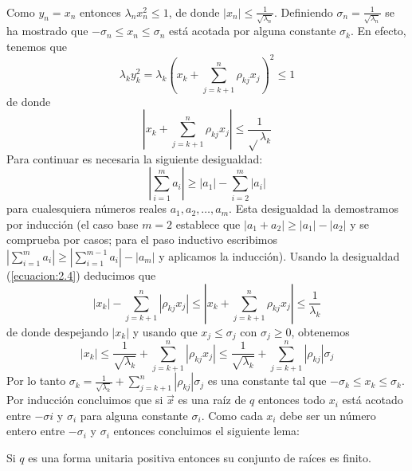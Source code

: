 \paragraph{}
Como $y_{n} = x_{n}$ entonces $\lambda_{n}x_{n}^{2} \leq 1$, de donde $|x_{n}| \leq \frac{1}{\sqrt{\lambda_{n}}}$. Definiendo $\sigma_{n}=\frac{1}{\sqrt{\lambda_{n}}}$ se ha mostrado que $-\sigma_{n} \leq x_{n} \leq \sigma_{n}$ está acotada por alguna constante $\sigma_{k}$. En efecto, tenemos que 
\begin{equation*}
\lambda_{k}y_{k}^{2} = \lambda_{k}\left(x_{k} + \sum_{j=k+1}^{n}\rho_{kj}x_{j}\right)^{2} \leq 1
\end{equation*} 
de donde 
\begin{equation*}
\left|x_{k} + \sum_{j=k+1}^{n} \rho_{kj} x_{j}\right| \leq \frac{1}{\sqrt{}\lambda_{k}}
\end{equation*} 
Para continuar es necesaria la siguiente desigualdad:
\begin{equation}
\left|\sum_{i=1}^{m} a_{i}\right| \geq \left|a_{1}\right| - \sum_{i=2}^{m}\left|a_{i}\right|
\label{ecuacion:2.4}
\end{equation} 
para cualesquiera números reales $a_{1}, a_{2}, \ldots, a_{m}$. Esta desigualdad la demostramos por inducción (el caso base $m=2$ establece que $\left|a_{1} + a_{2}\right| \geq \left|a_{1}\right| - \left|a_{2}\right|$ y se comprueba por casos; para el paso inductivo escribimos $\left|\sum_{i=1}^{m}a_{i}\right| \geq \left|\sum_{i=1}^{m-1}a_{i}\right| - \left|a_{m}\right|$ y aplicamos la inducción). Usando la desigualdad (\ref{ecuacion:2.4}) deducimos que 
\begin{equation*}
\left|x_{k}\right| - \sum_{j=k+1}^{n}\left| \rho_{kj}x_{j}\right| \leq \left|x_{k} + \sum_{j=k+1}^{n}\rho_{kj}x_{j}\right| \leq \frac{1}{\lambda_{k}}
\end{equation*} 
de donde despejando $\left|x_{k}\right|$ y usando que $x_{j} \leq \sigma_{j}$ con $\sigma_{j} \geq 0$, obtenemos
\begin{equation*}
\left|x_{k}\right| \leq \frac{1}{\sqrt{\lambda_{k}}} + \sum_{j=k+1}^{n}\left| \rho_{kj}x_{j}\right| \leq \frac{1}{\sqrt{\lambda_{k}}} + \sum_{j=k+1}^{n}\left|\rho_{kj}\right|\sigma_{j}
\end{equation*}
Por lo tanto $\sigma_{k} = \frac{1}{\sqrt{\lambda_{k}}} + \sum_{j=k+1}^{n}\left|\rho_{kj}\right|\sigma_{j}$ es una constante tal que $-\sigma_{k} \leq x_{k} \leq \sigma_{k}$. Por inducción concluimos que si $\overrightarrow{x}$ es una raíz de $q$ entonces todo $x_{i}$ está acotado entre $-\sigma{i}$ y $\sigma_{i}$ para alguna constante $\sigma_{i}$. Como cada $x_{i}$ debe ser un número entero entre $-\sigma_{i}$ y $\sigma_{i}$ entonces concluimos el siguiente lema:
\begin{lemma}
Si $q$ es una forma unitaria positiva entonces su conjunto de raíces es finito.
\label{lema:2.4}
\end{lemma}
